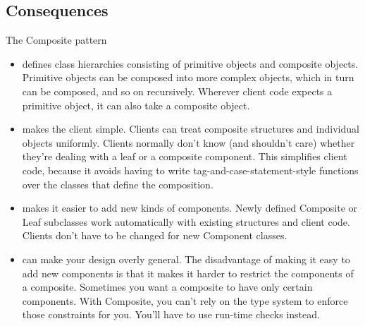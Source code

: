 \subsection*{Consequences}

The Composite pattern
\begin{itemize}
    \item defines class hierarchies consisting of primitive objects and composite objects. Primitive objects can be composed into more complex objects, which in turn can be composed, and so on recursively. Wherever client code expects a primitive object, it can also take a composite object.
    \item makes the client simple. Clients can treat composite structures and individual objects uniformly. Clients normally don't know (and shouldn't care) whether they're dealing with a leaf or a composite component. This simplifies client code, because it avoids having to write tag-and-case-statement-style functions over the classes that define the composition.
    \item makes it easier to add new kinds of components. Newly defined Composite or Leaf subclasses work automatically with existing structures and client code. Clients don't have to be changed for new Component classes.
    \item can make your design overly general. The disadvantage of making it easy to add new components is that it makes it harder to restrict the components of a composite. Sometimes you want a composite to have only certain components. With Composite, you can't rely on the type system to enforce those constraints for you. You'll have to use run-time checks instead.
\end{itemize}

